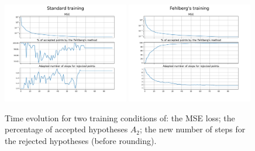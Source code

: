 \documentclass{article}
\begin{document}
\begin{figure}[thb]
  \centering
  \includegraphics[width=0.49\textwidth]{./figs/batch_training}
  \includegraphics[width=0.49\textwidth]{./figs/fehlberg_training}
  \caption{Time evolution for two training conditions of: the MSE loss; the percentage of
    accepted hypotheses $A_2$; the new number of steps for the rejected
    hypotheses (before rounding).}
  \label{fig:training_series}
\end{figure}
\end{document}
